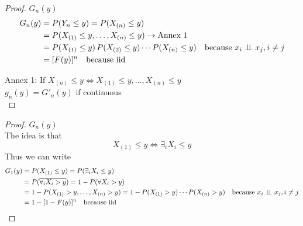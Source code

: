 \begin{proof}
    $G_n(y)$
    \begin{align*}
        G_n(y) & = P(Y_n\leq y) = P(X_{(n)}\leq y)\\
        & = P(X_{(1)}\leq y,\ldots, X_{(n)}\leq y) \to \text{Annex 1}\\
        & = P(X_{(1)}\leq y)\,P(X_{(2)}\leq y)\cdots P(X_{(n)}\leq y)\quad \text{because }x_i\perp\!\!\!\perp x_j, i\neq j\\
        & = [F(y)]^n\quad \text{because iid}
    \end{align*}

    Annex 1: If $X_{(n)}\leq y\Leftrightarrow X_{(1)}\leq y,\ldots, X_{(n)}\leq y$\\

    $g_n(y) = G'_n(y)$ if continuous\\
\end{proof}
\begin{proof}
    $G_n(y)$\\

    The idea is that
    \begin{equation*}
        X_{(1)}\leq y \Leftrightarrow \exists_i X_i \leq y
    \end{equation*}
    Thus we can write
    \begin{align*}
        G_1(y) & = P(X_{(1)}\leq y) = P(\exists_i X_i\leq y)\\
        & = P(\overline{\forall_i X_i>y}) = 1-P(\forall X_i>y)\\
        & = 1 - P(X_{(1)}>y, \ldots, X_{(n)}>y) = 1 - P(X_{(1)}>y)\cdots P(X_{(n)}>y) \quad \text{because }x_i\perp\!\!\!\perp x_j, i\neq j\\
        & = 1 - [1-F(y)]^n \quad \text{because iid}
    \end{align*}
\end{proof}


